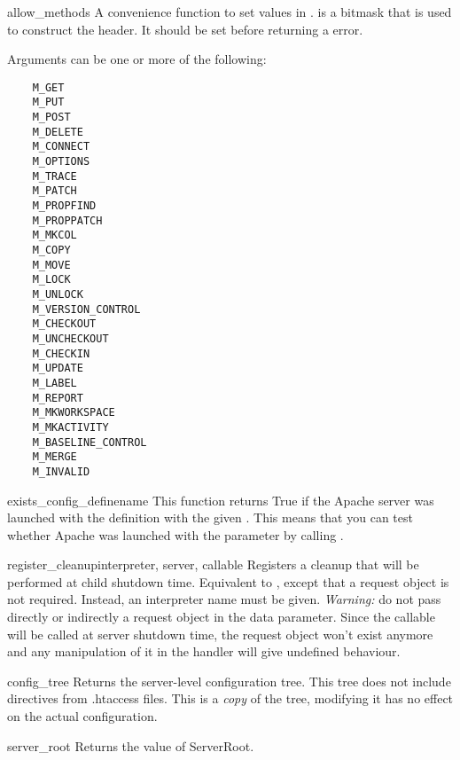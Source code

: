 \begin{funcdesc}{allow_methods}{}
  A convenience function to set values in .
   is a bitmask that is used to construct the
   header. It should be set before returning a
   error.

  Arguments can be one or more of the following:
  \begin{verbatim}
    M_GET
    M_PUT
    M_POST
    M_DELETE
    M_CONNECT
    M_OPTIONS
    M_TRACE
    M_PATCH
    M_PROPFIND
    M_PROPPATCH
    M_MKCOL
    M_COPY
    M_MOVE
    M_LOCK
    M_UNLOCK
    M_VERSION_CONTROL
    M_CHECKOUT
    M_UNCHECKOUT
    M_CHECKIN
    M_UPDATE
    M_LABEL
    M_REPORT
    M_MKWORKSPACE
    M_MKACTIVITY
    M_BASELINE_CONTROL
    M_MERGE
    M_INVALID
  \end{verbatim}

\end{funcdesc}

\begin{funcdesc}{exists_config_define}{name}
    This function returns True if the Apache server was launched
    with the definition with the given . This means
    that you can test whether Apache was launched with the 
    parameter by calling .
\end{funcdesc}

\begin{funcdesc}{register_cleanup}{interpreter, server, callable}
  Registers a cleanup that will be performed at child shutdown time. Equivalent to 
  , except that a request object is not required.
  Instead, an interpreter name must be given.
  \emph{Warning:} do not pass directly or indirectly a request object in the data parameter.
  Since the callable will be called at server shutdown time, the request object
  won't exist anymore and any manipulation of it in the handler will give
  undefined behaviour.
\end{funcdesc}

\begin{funcdesc}{config_tree}{}
  Returns the server-level configuration tree. This tree does not
  include directives from .htaccess files. This is a \emph{copy} of
  the tree, modifying it has no effect on the actual configuration.
\end{funcdesc}

\begin{funcdesc}{server_root}{}
  Returns the value of ServerRoot.
\end{funcdesc}


